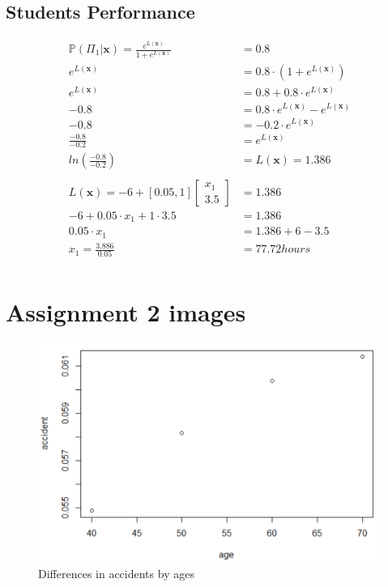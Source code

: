 

\subsection{Students Performance}
\label{app:students_performance}

\begin{align*}
    \mathbb{P}(\Pi_1 | \textbf{x}) = \frac{e^{L(\textbf{x})}}{1+e^{L(\textbf{x})}} &= 0.8 \\
    e^{L(\textbf{x})} &= 0.8 \cdot (1+e^{L(\textbf{x})}) \\
    e^{L(\textbf{x})} &= 0.8 + 0.8 \cdot e^{L(\textbf{x})} \\
    -0.8 &= 0.8 \cdot e^{L(\textbf{x})} - e^{L(\textbf{x})} \\ 
    -0.8 &= -0.2 \cdot e^{L(\textbf{x})} \\
    \frac{-0.8}{-0.2} &= e^{L(\textbf{x})} \\
    ln(\frac{-0.8}{-0.2}) &= L(\textbf{x}) = 1.386 \\
    & \\
    L(\textbf{x}) = -6+[0.05,1]\begin{bmatrix}x_1 \\ 3.5\end{bmatrix}&=1.386 \\
    -6+0.05 \cdot x_1+1 \cdot 3.5&=1.386\\
    0.05 \cdot x_1&=1.386+6-3.5\\
    x_1=\frac{3.886}{0.05}&=77.72 hours \\
\end{align*}

\section{Assignment 2 images}
\label{app:alcohol_related_car_crashes}

\begin{figure}[H]
    \centering
    \includegraphics[scale=0.5]{difference_of_ages.PNG}
    \caption{Differences in accidents by ages}
    \label{fig:differences_in_ages}
\end{figure}

